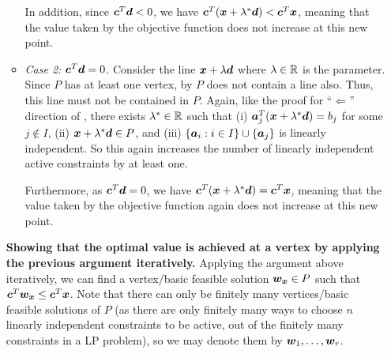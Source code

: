 \begin{enumerate}
\begin{pf}
\begin{itemize}
In addition, since \(\bm{c}^{T}\bm{d}<0\), we have
\(\bm{c}^{T}(\bm{x}+\lambda^*\bm{d})<\bm{c}^{T}\bm{x}\), meaning that
the value taken by the objective function does not increase at this new point.
\begin{center}
\end{center}
\item \emph{Case 2: \(\bm{c}^{T}\bm{d}=0\).} Consider the line
\(\bm{x}+\lambda\bm{d}\) where \(\lambda\in\mathbb{R}\) is the parameter. Since
\(P\) has at least one vertex, by  \(P\) does not
contain a line also. Thus, this line must not be contained in \(P\). Again,
like the proof for ``\(\Leftarrow\)'' direction of
, there exists \(\lambda^*\in\mathbb{R}\) such that
(i) \(\bm{a}_j^{T}(\bm{x}+\lambda^{*}\bm{d})=b_j\) for some \(j\notin I\),
(ii) \( \bm{x}+\lambda^{*}\bm{d}\in P\), and (iii) \(\{\bm{a}_{i}:i\in I\}\cup\{\bm{a}_j\}\)
is linearly independent. So this again increases the number of linearly
independent active constraints by at least one.

Furthermore, as \(\bm{c}^{T}\bm{d}=0\), we have
\(\bm{c}^{T}(\bm{x}+\lambda^{*}\bm{d})=\bm{c}^{T}\bm{x}\), meaning
that the value taken by the objective function again does not increase at this
new point.
\end{itemize}

\textbf{Showing that the optimal value is achieved at a vertex by applying the
previous argument iteratively.} Applying the argument above iteratively, we can
find a vertex/basic feasible solution \(\bm{w_x}\in P\) such that
\(\bm{c}^{T}\bm{w_{x}}\le\bm{c}^{T}\bm{x}\).  Note that there can only be finitely
many vertices/basic feasible solutions of \(P\) (as there are only finitely
many ways to choose \(n\) linearly independent constraints to be active, out of
the finitely many constraints in a LP problem), so we may denote them by
\(\bm{w}_{1},\dotsc,\bm{w}_r\).


\end{pf}
\end{enumerate}
